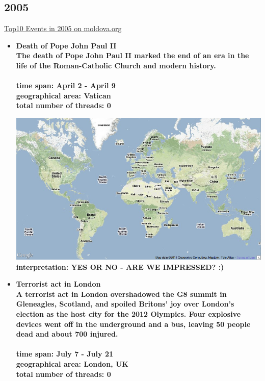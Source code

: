 \documentclass[11pt,a4paper,english]{article}
\begin{document}
			\subsection{2005}
			\href{http://politicom.moldova.org/news/10-most-important-world-events-of-2005-7712-eng.html}{Top10 Events in 2005 on moldova.org}
				\begin{itemize}
				\item \bf Death of Pope John Paul II\rm
					\\ The death of Pope John Paul II marked the end of an era in the life of the Roman-Catholic Church and modern history. 
					\\\\ \bf time span: \rm April 2 - April 9
					\\ \bf geographical area: \rm Vatican
					\\ \bf total number of threads: \rm 0
					
						\includegraphics[width=130mm]{img/2005-1}
					\bf interpretation: \rm YES OR NO - ARE WE IMPRESSED? :)
						


				\item \bf Terrorist act in London \rm
					\\ A terrorist act in London overshadowed the G8 summit in Gleneagles, Scotland, and spoiled Britons' joy over London's election as the host city for the 2012 Olympics. Four explosive devices went off in the underground and a bus, leaving 50 people dead and about 700 injured.
					\\\\ \bf time span: \rm July 7 - July 21
					\\ \bf geographical area: \rm London, UK
					\\ \bf total number of threads: \rm 0
					

\end{itemize}
\end{document}
